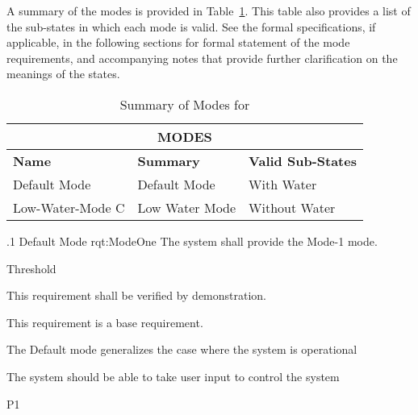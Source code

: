 
A summary of the modes is provided in Table~\ref{tab:Modes}.
This table also provides a list of the sub-states in which each mode is valid.
See the formal specifications, if applicable, in the following sections for formal statement of the mode requirements, and accompanying notes that provide further clarification on the meanings of the states.
\begin{table}[htbp]
	\begin{center}
		\begin{tabular}{|p{1.0in}|p{4.0in}|p{1.0in}|}
			\hline
			\hline
			     \multicolumn{3}{|c|}{{\bf MODES}}\\
			\hline
{\bf Name} & {\bf Summary}	& {\bf Valid Sub-States}\\
			\hline
			\hline
Default Mode & Default Mode & With Water \\ \hline
Low-Water-Mode C & Low Water Mode & Without Water \\ 
			\hline
			\hline
			\end{tabular}
				\caption{Summary of Modes for \ThisSystem}
				\label{tab:Modes}
		\end{center}
\end{table}


\ONERQMTV
{\RqtNumberBase.1}
{Default Mode}
{rqt:ModeOne}
{The system shall provide the Mode-1 mode.}
{
	\item [Phase 1] Threshold
}
{This requirement shall be verified by demonstration.}
{
	\item [N/A] This requirement is a base requirement.
}
{
	\item The Default mode generalizes the case where the system is operational
	\item The system should be able to take user input to control the system
}
{P1}


